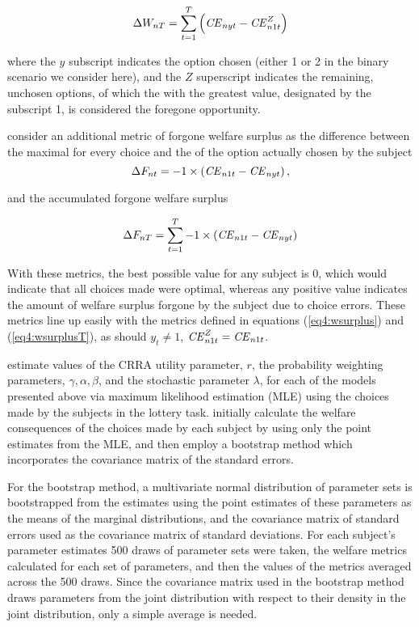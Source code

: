 \documentclass[../main.tex]{subfiles}
\begin{document}
\begin{equation}
	\label{eq4:wsurplusT}
	\Delta W_{nT} = \sum_{t=1}^T \left( {\mathit{CE}}_{nyt} - {\mathit{CE}}_{n1t}^Z \right)
\end{equation}

\noindent where the $y$ subscript indicates the option chosen (either 1 or 2 in the binary scenario we consider here), and the $Z$ superscript indicates the remaining, unchosen options, of which the {\CE} with the greatest value, designated by the subscript 1, is considered the foregone opportunity.

\textcite[106]{Harrison2016} consider an additional metric of forgone welfare surplus as the difference between the maximal {\CE} for every choice and the {\CE} of the option actually chosen by the subject
\begin{equation}
	\label{eq4:wforgone}
	\Delta F_{nt} = -1 \times \left( {\mathit{CE}}_{n1t} - {\mathit{CE}}_{nyt} \right) , 
\end{equation}

\noindent and the accumulated forgone welfare surplus

\begin{equation}
	\label{eq4:wforgoneT}
	\Delta F_{nT} = \sum_{t=1}^T  -1 \times \left( {\mathit{CE}}_{n1t} - {\mathit{CE}}_{nyt} \right)
\end{equation}

\noindent With these metrics, the best possible value for any subject is 0, which would indicate that all choices made were optimal, whereas any positive value indicates the amount of welfare surplus forgone by the subject due to choice errors.
These metrics line up easily with the metrics defined in equations (\ref{eq4:wsurplus}) and (\ref{eq4:wsurplusT}), as should $y_t \neq 1$, ${\mathit{CE}}_{n1t}^Z = {\mathit{CE}}_{n1t}$.

\textcite{Harrison2016} estimate values of the CRRA utility parameter, $r$, the probability weighting parameters, $\gamma, \alpha, \beta$, and the stochastic parameter $\lambda$, for each of the models presented above via maximum likelihood estimation (MLE) using the choices made by the subjects in the lottery task.
\textcite[107,110]{Harrison2016} initially calculate the welfare consequences of the choices made by each subject by using only the point estimates from the MLE, and then employ a bootstrap method which incorporates the covariance matrix of the standard errors.

For the bootstrap method, a multivariate normal distribution of parameter sets is bootstrapped from the estimates using the point estimates of these parameters as the means of the marginal distributions, and the covariance matrix of standard errors used as the covariance matrix of standard deviations.
For each subject's parameter estimates 500 draws of parameter sets were taken, the welfare metrics calculated for each set of parameters, and then the values of the metrics averaged across the 500 draws.
Since the covariance matrix used in the bootstrap method draws parameters from the joint distribution with respect to their density in the joint distribution, only a simple average is needed.
\end{document}
